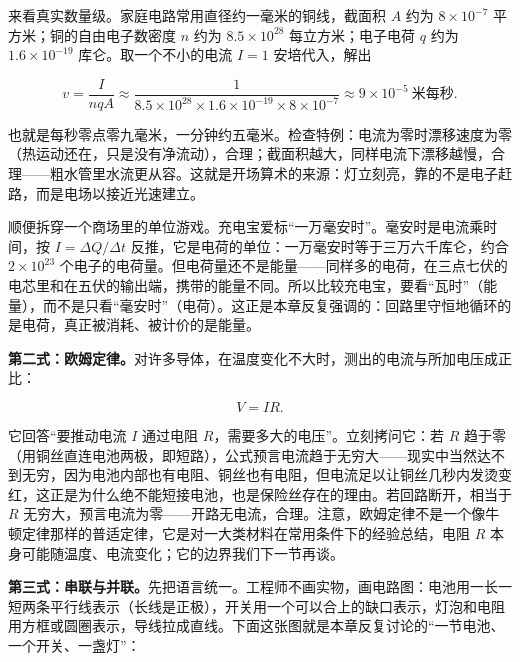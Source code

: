 来看真实数量级。家庭电路常用直径约一毫米的铜线，截面积 \(A\) 约为 \(8\times10^{-7}\) 平方米；铜的自由电子数密度 \(n\) 约为 \(8.5\times10^{28}\) 每立方米；电子电荷 \(q\) 约为 \(1.6\times10^{-19}\) 库仑。取一个不小的电流 \(I=1\) 安培代入，解出

\[
v=\frac{I}{nqA}\approx\frac{1}{8.5\times10^{28}\times1.6\times10^{-19}\times8\times10^{-7}}\approx9\times10^{-5}\ \text{米每秒}.
\]

也就是每秒零点零九毫米，一分钟约五毫米。检查特例：电流为零时漂移速度为零（热运动还在，只是没有净流动），合理；截面积越大，同样电流下漂移越慢，合理——粗水管里水流更从容。这就是开场算术的来源：灯立刻亮，靠的不是电子赶路，而是电场以接近光速建立。

顺便拆穿一个商场里的单位游戏。充电宝爱标“一万毫安时”。毫安时是电流乘时间，按 \(I=\Delta Q/\Delta t\) 反推，它是电荷的单位：一万毫安时等于三万六千库仑，约合 \(2\times10^{23}\) 个电子的电荷量。但电荷量还不是能量——同样多的电荷，在三点七伏的电芯里和在五伏的输出端，携带的能量不同。所以比较充电宝，要看“瓦时”（能量），而不是只看“毫安时”（电荷）。这正是本章反复强调的：回路里守恒地循环的是电荷，真正被消耗、被计价的是能量。

\textbf{第二式：欧姆定律。}对许多导体，在温度变化不大时，测出的电流与所加电压成正比：

\[
V=IR.
\]

它回答“要推动电流 \(I\) 通过电阻 \(R\)，需要多大的电压”。立刻拷问它：若 \(R\) 趋于零（用铜丝直连电池两极，即短路），公式预言电流趋于无穷大——现实中当然达不到无穷，因为电池内部也有电阻、铜丝也有电阻，但电流足以让铜丝几秒内发烫变红，这正是为什么绝不能短接电池，也是保险丝存在的理由。若回路断开，相当于 \(R\) 无穷大，预言电流为零——开路无电流，合理。注意，欧姆定律不是一个像牛顿定律那样的普适定律，它是对一大类材料在常用条件下的经验总结，电阻 \(R\) 本身可能随温度、电流变化；它的边界我们下一节再谈。

\textbf{第三式：串联与并联。}先把语言统一。工程师不画实物，画电路图：电池用一长一短两条平行线表示（长线是正极），开关用一个可以合上的缺口表示，灯泡和电阻用方框或圆圈表示，导线拉成直线。下面这张图就是本章反复讨论的“一节电池、一个开关、一盏灯”：

\begin{center}
\end{center}

